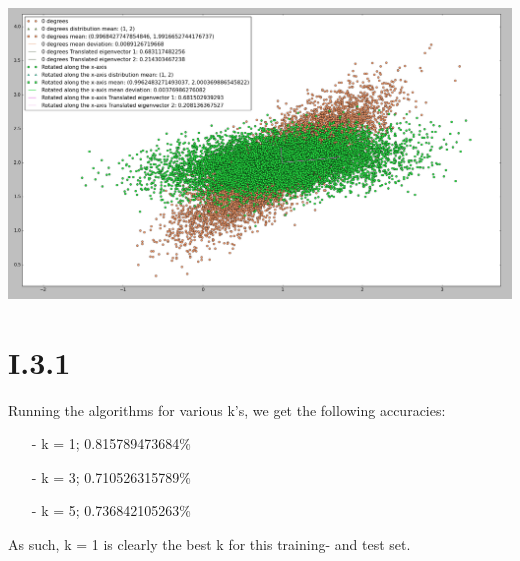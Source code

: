 \documentclass[12pt, a4paper]{article}
\begin{document}
\begin{itemize}
\includegraphics[width=\textwidth]{7.png}

\end{itemize}

\section{I.3.1}

Running the algorithms for various k's, we get the following accuracies:

\begin{itemize}
\item[-] k = 1; 0.815789473684\%
\item[-] k = 3; 0.710526315789\% 
\item[-] k = 5; 0.736842105263\%
\end{itemize}

As such, k = 1 is clearly the best k for this training- and test set.
\end{document}
